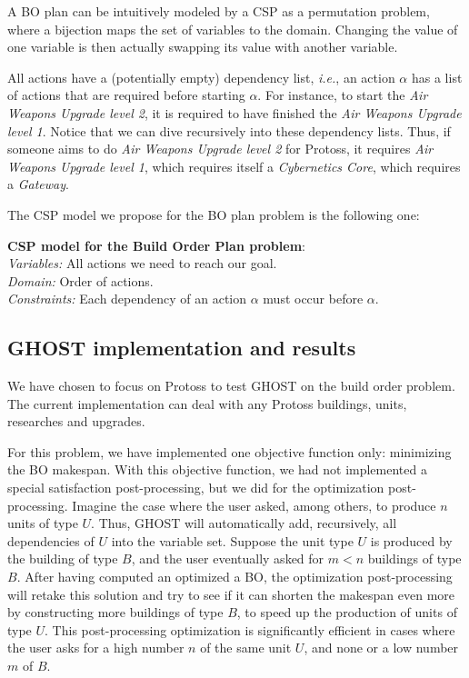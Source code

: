 \documentclass[journal]{IEEEtran}
\newcommand{\csp}{\textsc{CSP}\xspace}
\newcommand{\ghost}{\textsc{GHOST}\xspace}
\newcommand{\ie}{\textit{i.e.}}
\newcommand{\modelcsp}[4]%
{ \begin{trivlist}
  \item[]%
    \textbf{CSP model for #1}:\\
    \textit{Variables:} #2\\
    \textit{Domain:} #3\\
    \textit{Constraints:} #4
  \end{trivlist}%
}
\begin{document}
A  BO  plan can  be intuitively  modeled by  a \csp  as a
permutation problem,  where a bijection  maps the set of  variables to
the  domain. Changing  the  value  of one  variable  is then  actually
swapping its value with another variable.

All actions have a (potentially empty) dependency list, \ie, an action
$\alpha$  has a  list of  actions  that are  required before  starting
$\alpha$.   For instance,  to  start the  \textit{Air Weapons  Upgrade
  level 2},  it is required  to have finished the  \textit{Air Weapons
  Upgrade level  1}. Notice  that we can  dive recursively  into these
dependency  lists.  Thus,  if someone  aims to  do \textit{Air  Weapons
  Upgrade  level  2}  for  Protoss, it  requires  \textit{Air  Weapons
  Upgrade level 1}, which requires itself a \textit{Cybernetics Core},
which requires a \textit{Gateway}.

The \csp model we propose for the BO plan problem is the
following one:
\modelcsp{the Build Order Plan problem}%
{All actions we need to reach our goal.}%
{Order of actions.}%
{Each dependency of an action $\alpha$ must occur before $\alpha$.}

\subsection{\ghost implementation and results}

We have chosen to  focus on Protoss to test \ghost  on the build order
problem.   The  current  implementation  can  deal  with  any  Protoss
buildings, units, researches and upgrades.

For this  problem, we  have implemented  one objective  function only:
minimizing the BO makespan.  With  this objective function, we 
had not implemented  a special  satisfaction post-processing, but  we did
for the optimization post-processing. Imagine  the case where the user
asked, among  others, to produce $n$  units of type $U$.  Thus, \ghost
will automatically add, recursively, all  dependencies of $U$ into the
variable set.  Suppose  the unit type $U$ is produced  by the building
of type $B$,  and the user eventually  asked for $m <  n$ buildings of
type $B$.   After having  computed an  optimized a BO,  the optimization
post-processing will  retake this solution  and try  to see if  it can
shorten the makespan even more  by constructing more buildings of type
$B$,  to  speed  up  the  production  of  units  of  type  $U$.   This
post-processing optimization  is significantly efficient in  cases where the
user asks for a high number $n$ of the same unit $U$, and none or a low
number $m$ of $B$.
\end{document}
